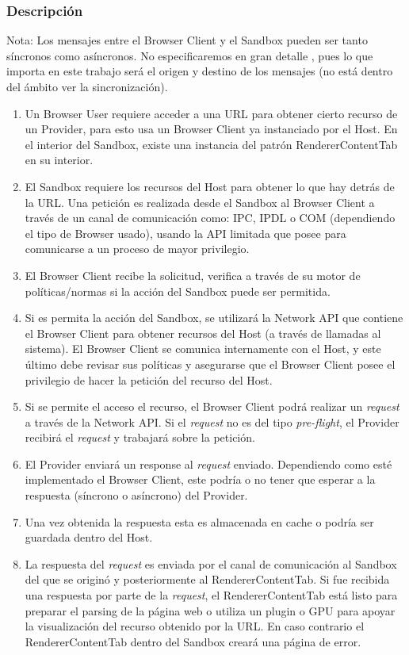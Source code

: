 \subsubsection{Descripción}
Nota: Los mensajes entre el Browser Client y el Sandbox pueden ser tanto síncronos como asíncronos. No especificaremos en gran detalle , pues lo que importa en este trabajo será el origen y destino de los mensajes (no está dentro del ámbito ver la sincronización).
	\begin{enumerate}
		\item Un Browser User requiere acceder a una URL para obtener cierto recurso de un Provider, para esto usa un Browser Client ya instanciado por el Host. En el interior del Sandbox, existe una instancia del patrón RendererContentTab en su interior. 
\item El Sandbox requiere los recursos del Host para obtener lo que hay detrás de la URL. Una petición es realizada desde el Sandbox al Browser Client a través de un canal de comunicación como: IPC, IPDL o COM (dependiendo el tipo de Browser usado), usando la API limitada que posee para comunicarse a un proceso de mayor privilegio. 
\item El Browser Client recibe la solicitud, verifica a través de su motor de políticas/normas si la acción del Sandbox puede ser permitida.
\item Si es permita la acción del Sandbox, se utilizará la Network API que contiene el Browser Client para obtener recursos del Host (a través de llamadas al sistema). El Browser Client se comunica internamente con el Host, y este último debe revisar sus políticas y asegurarse que el Browser Client posee el privilegio de hacer la petición del recurso del Host.
\item Si se permite el acceso el recurso, el Browser Client podrá realizar un \textit{request} a través de la Network API. Si el \textit{request} no es del tipo \textit{pre-flight}, el Provider recibirá el \textit{request} y trabajará sobre la petición.
\item El Provider enviará un response al \textit{request} enviado. Dependiendo como esté implementado el Browser Client, este podría o no tener que esperar a la respuesta (síncrono o asíncrono) del Provider.
\item Una vez obtenida la respuesta esta es almacenada en cache o podría ser guardada dentro del Host. 
\item La respuesta del \textit{request} es enviada por el canal de comunicación al Sandbox del que se originó y posteriormente al RendererContentTab. Si fue recibida una respuesta por parte de la \textit{request}, el RendererContentTab está listo para preparar el parsing de la página web o utiliza un plugin o GPU para apoyar la visualización del recurso obtenido por la URL. En caso contrario el RendererContentTab dentro del Sandbox creará una página de error.
	\end{enumerate}
